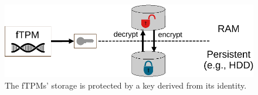 \begin{figure}[htpb]
  \centering
  \includegraphics[width=0.8\linewidth]{figures/storage-encryption.pdf}
  \caption{The fTPMs' storage is protected by a key derived from its identity.} \label{fig:storage-encryption}
\end{figure}
